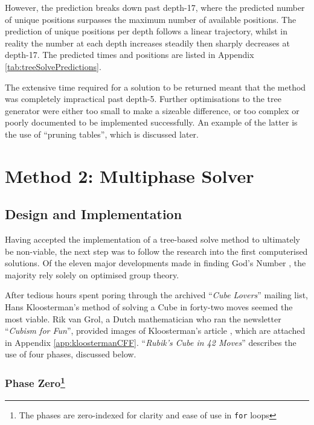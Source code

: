 \documentclass{report}
\newcommand{\tit}[1]{\textit{#1}}
\newcommand{\propernoun}[1]{\enquote{\tit{#1}}}
\newcommand{\depth}[1]{depth-#1}
\begin{document}
    However, the prediction breaks down past \depth{17}, where the predicted number of unique positions surpasses the maximum number of available positions. The prediction of unique positions per depth follows a linear trajectory, whilst in reality the number at each depth increases steadily then sharply decreases at \depth{17}. The predicted times and positions are listed in Appendix \ref{tab:treeSolvePredictions}.
    
    The extensive time required for a solution to be returned meant that the method was completely impractical past \depth{5}. Further optimisations to the tree generator were either too small to make a sizeable difference, or too complex or poorly documented to be implemented successfully. An example of the latter is the use of \enquote{pruning tables}, which is discussed later.
    
	\section{Method 2: Multiphase Solver} \label{sec:multiphaseSolving}
	
	\subsection{Design and Implementation}
	
	Having accepted the implementation of a tree-based solve method to ultimately be non-viable, the next step was to follow the research into the first computerised solutions. Of the eleven major developments made in finding God's Number \cite{Rokicki2010}, the majority rely solely on optimised group theory.
	
	After tedious hours spent poring through the archived \propernoun{Cube Lovers} mailing list, Hans Kloosterman's method of solving a Cube in forty-two moves seemed the most viable. Rik van Grol, a Dutch mathematician who ran the newsletter \propernoun{Cubism for Fun}, provided images of Kloosterman's article \cite{Kloosterman1990}, which are attached in Appendix \ref{app:kloostermanCFF}. \propernoun{Rubik's Cube in 42 Moves} describes the use of four phases, discussed below.
	
	\subsubsection[Phase Zero]{Phase Zero\protect\footnote{The phases are zero-indexed for clarity and ease of use in \lstinline|for| loops}}
	
\end{document}
